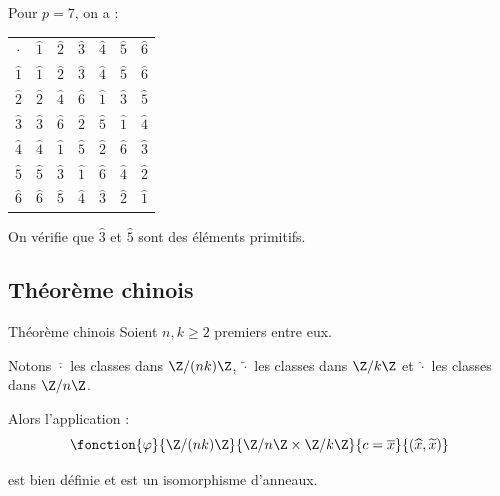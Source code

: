 \begin{exemple}
    Pour $p = 7$, on a :
    \begin{center}
    \begin{tabular}{ccccccc}
        \toprule
        $\cdot$ & $\widehat 1$ & $\widehat 2$ & $\widehat 3$ & $\widehat 4$ & $\widehat 5$ & $\widehat 6$ \\
        $\widehat 1$ & $\widehat 1$ & $\widehat 2$ & $\widehat 3$ & $\widehat 4$ & $\widehat 5$ & $\widehat 6$ \\
        $\widehat 2$ & $\widehat 2$ & $\widehat 4$ & $\widehat 6$ & $\widehat 1$ & $\widehat 3$ & $\widehat 5$ \\
        $\widehat 3$ & $\widehat 3$ & $\widehat 6$ & $\widehat 2$ & $\widehat 5$ & $\widehat 1$ & $\widehat 4$ \\
        $\widehat 4$ & $\widehat 4$ & $\widehat 1$ & $\widehat 5$ & $\widehat 2$ & $\widehat 6$ & $\widehat 3$ \\
        $\widehat 5$ & $\widehat 5$ & $\widehat 3$ & $\widehat 1$ & $\widehat 6$ & $\widehat 4$ & $\widehat 2$ \\
        $\widehat 6$ & $\widehat 6$ & $\widehat 5$ & $\widehat 4$ & $\widehat 3$ & $\widehat 2$ & $\widehat 1$ \\
        \bottomrule
    \end{tabular}
    \end{center}
    On vérifie que $\widehat 3$ et $\widehat 5$ sont des éléments primitifs.
\end{exemple}

\subsection{Théorème chinois}

\begin{theoreme}{Théorème chinois}{}
    Soient $n, k \geqslant 2$ premiers entre eux.

    Notons $\overline{\cdot}$ les classes dans $\Z / (n k) \Z$,
    $\widetilde{\cdot}$ les classes dans $\Z / k \Z$ et 
    $\widehat{\cdot}$ les classes dans $\Z / n \Z$.

    Alors l'application :
    \[\fonction{\varphi}{\Z / (n k) \Z}{\Z / n \Z \times \Z / k \Z}{c = \overline x}{(\widehat x, \widetilde x)}\]

    est bien définie et est un isomorphisme d'anneaux.
\end{theoreme}

